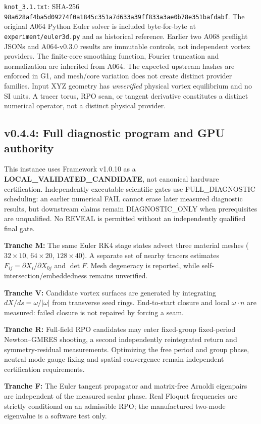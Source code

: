 \documentclass[11pt,a4paper]{article}
\begin{document}
\texttt{knot\_3.1.txt}: SHA-256 \texttt{98a628af4ba5d09274f0a1845c351a7}\allowbreak\texttt{d633a39ff833a3ae0b78e351bafdabf}. The original A064 Python Euler solver is included byte-for-byte at \texttt{experiment/euler3d.py} and as historical reference. Earlier two A068 preflight JSONs and A064-v0.3.0 results are immutable controls, not independent vortex providers. The finite-core smoothing function, Fourier truncation and normalization are inherited from A064. The expected upstream hashes are enforced in G1, and mesh/core variation does not create distinct provider families. Input XYZ geometry has \emph{unverified} physical vortex equilibrium and no SI units. A tracer torus, RPO scan, or tangent derivative constitutes a distinct numerical operator, not a distinct physical provider.

\subsection*{v0.4.4: Full diagnostic program and GPU authority}
This instance uses Framework v1.0.10 as a \textbf{LOCAL\_VALIDATED\_CANDIDATE}, not canonical hardware certification. Independently executable scientific gates use FULL\_DIAGNOSTIC scheduling: an earlier numerical FAIL cannot erase later measured diagnostic results, but downstream claims remain DIAGNOSTIC\_ONLY when prerequisites are unqualified. No REVEAL is permitted without an independently qualified final gate.\par
\textbf{Tranche M:} The same Euler RK4 stage states advect three material meshes ($32\times10$, $64\times20$, $128\times40$). A separate set of nearby tracers estimates $F_{ij}=\partial X_i/\partial X_{0j}$ and $\det F$. Mesh degeneracy is reported, while self-intersection/embeddedness remains unverified.\par
\textbf{Tranche V:} Candidate vortex surfaces are generated by integrating $dX/ds=\omega/|\omega|$ from transverse seed rings. End-to-start closure and local $\omega\cdot n$ are measured: failed closure is not repaired by forcing a seam.\par
\textbf{Tranche R:} Full-field RPO candidates may enter fixed-group fixed-period Newton--GMRES shooting, a second independently reintegrated return and symmetry-residual measurements. Optimizing the free period and group phase, neutral-mode gauge fixing and spatial convergence remain independent certification requirements.\par
\textbf{Tranche F:} The Euler tangent propagator and matrix-free Arnoldi eigenpairs are independent of the measured scalar phase. Real Floquet frequencies are strictly conditional on an admissible RPO; the manufactured two-mode eigenvalue is a software test only.\par
\end{document}

